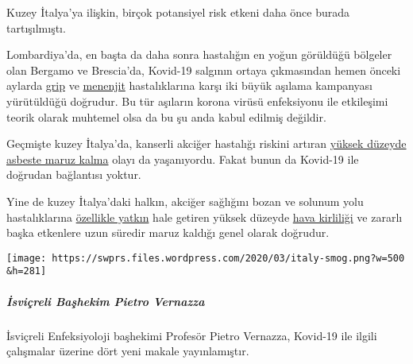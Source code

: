 Kuzey İtalya'ya ilişkin, birçok potansiyel risk etkeni daha önce burada
tartışılmıştı.

Lombardiya'da, en başta da daha sonra hastalığın en yoğun görüldüğü
bölgeler olan Bergamo ve Brescia'da, Kovid-19 salgının ortaya
çıkmasından hemen önceki aylarda
\href{https://www.bergamonews.it/2019/10/21/vaccinazione-antinfluenzale-a-bergamo-ordinate-185-000-dosi-di-vaccino/332164/}{grip}
ve
\href{https://www.bsnews.it/2020/01/18/meningite-vaccinate-34mila-persone-tra-brescia-e-bergamo/}{menenjit}
hastalıklarına karşı iki büyük aşılama kampanyası yürütüldüğü doğrudur.
Bu tür aşıların korona virüsü enfeksiyonu ile etkileşimi teorik olarak
muhtemel olsa da bu şu anda kabul edilmiş değildir.

Geçmişte kuzey İtalya'da, kanserli akciğer hastalığı riskini artıran
\href{https://www.spiegel.de/panorama/justiz/asbest-prozess-in-italien-nun-sind-alle-krank-a-666421.html}{yüksek
düzeyde asbeste maruz kalma} olayı da yaşanıyordu. Fakat bunun da
Kovid-19 ile doğrudan bağlantısı yoktur.

Yine de kuzey İtalya'daki halkın, akciğer sağlığını bozan ve solunum
yolu hastalıklarına
\href{https://www.thelocal.it/20170131/our-lungs-are-breaking-smog-levels-way-above-safe-limits-in-northern-italy}{özellikle
yatkın} hale getiren yüksek düzeyde
\href{https://twitter.com/esa/status/1238480433047916545}{hava
kirliliği} ve zararlı başka etkenlere uzun süredir maruz kaldığı genel
olarak doğrudur.

\texttt{[image: https://swprs.files.wordpress.com/2020/03/italy-smog.png?w=500\\\&h=281]}

\hypertarget{isviuxe7reli-baux15fhekim-pietro-vernazza}{%
\subparagraph{\texorpdfstring{\textbf{İsviçreli Başhekim Pietro
Vernazza}}{İsviçreli Başhekim Pietro Vernazza}}\label{isviuxe7reli-baux15fhekim-pietro-vernazza}}

İsviçreli Enfeksiyoloji başhekimi Profesör Pietro Vernazza, Kovid-19 ile
ilgili çalışmalar üzerine dört yeni makale yayınlamıştır.

